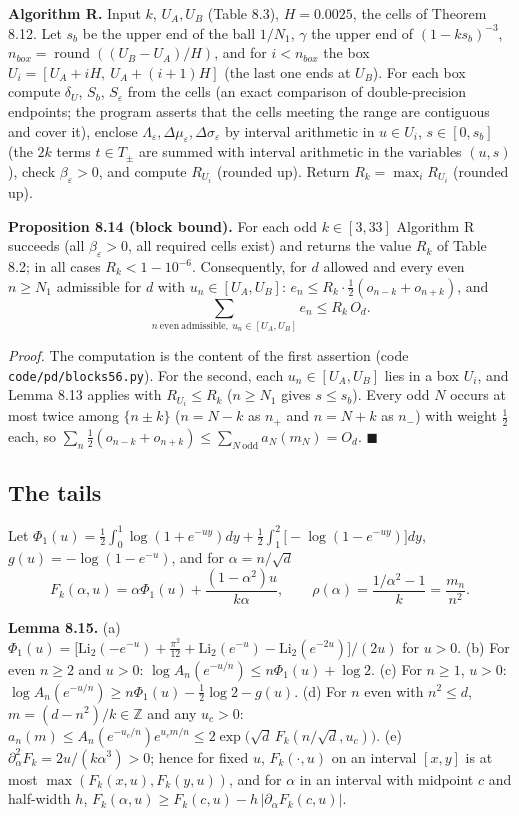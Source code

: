 \textbf{Algorithm R.} Input \(k\), \(U_A,U_B\) (Table 8.3), \(H=0.0025\), the cells of Theorem 8.12. Let \(s_b\) be the upper end of the ball \(1/N_1\), \(\gamma\) the upper end of \((1-ks_b)^{-3}\), \(n_{box}=\operatorname{round}((U_B-U_A)/H)\), and for \(i<n_{box}\) the box \(U_i=[U_A+iH,\ U_A+(i+1)H]\) (the last one ends at \(U_B\)). For each box compute \(\delta_U\), \(S_b\), \(S_\varepsilon\) from the cells (an exact comparison of double-precision endpoints; the program asserts that the cells meeting the range are contiguous and cover it), enclose \(\Lambda_\varepsilon,\Delta\mu_\varepsilon,\Delta\sigma_\varepsilon\) by interval arithmetic in \(u\in U_i\), \(s\in[0,s_b]\) (the \(2k\) terms \(t\in T_\pm\) are summed with interval arithmetic in the variables \((u,s)\)), check \(\beta_\varepsilon>0\), and compute \(R_{U_i}\) (rounded up). Return \(R_k=\max_iR_{U_i}\) (rounded up).

\textbf{Proposition 8.14 (block bound).} For each odd \(k\in[3,33]\) Algorithm R succeeds (all \(\beta_\varepsilon>0\), all required cells exist) and returns the value \(R_k\) of Table 8.2; in all cases \(R_k<1-10^{-6}\). Consequently, for \(d\) allowed and every even \(n\ge N_1\) admissible for \(d\) with \(u_n\in[U_A,U_B]\): \(e_n\le R_k\cdot\frac12(o_{n-k}+o_{n+k})\), and
\[\sum_{n\ \mathrm{even}\ \mathrm{admissible},\ u_n\in[U_A,U_B]}e_n\le R_k\,O_d.\]

\emph{Proof.} The computation is the content of the first assertion (code \texttt{code/pd/blocks56.py}). For the second, each \(u_n\in[U_A,U_B]\) lies in a box \(U_i\), and Lemma 8.13 applies with \(R_{U_i}\le R_k\) (\(n\ge N_1\) gives \(s\le s_b\)). Every odd \(N\) occurs at most twice among \(\{n\pm k\}\) (\(n=N-k\) as \(n_+\) and \(n=N+k\) as \(n_-\)) with weight \(\frac12\) each, so \(\sum_n\frac12(o_{n-k}+o_{n+k})\le\sum_{N\ \mathrm{odd}}a_N(m_N)=O_d\). \(\blacksquare\)

\subsection{The tails}\label{the-tails}

Let \(\Phi_1(u)=\frac12\int_0^1\log(1+e^{-uy})dy+\frac12\int_1^2\bigl[-\log(1-e^{-uy})\bigr]dy\), \(g(u)=-\log(1-e^{-u})\), and for \(\alpha=n/\sqrt d\)
\[F_k(\alpha,u)=\alpha\Phi_1(u)+\frac{(1-\alpha^2)u}{k\alpha},\qquad\rho(\alpha)=\frac{1/\alpha^2-1}k=\frac{m_n}{n^2}.\]

\textbf{Lemma 8.15.} (a) \(\Phi_1(u)=\bigl[\mathrm{Li}_2(-e^{-u})+\frac{\pi^2}{12}+\mathrm{Li}_2(e^{-u})-\mathrm{Li}_2(e^{-2u})\bigr]/(2u)\) for \(u>0\).
(b) For even \(n\ge2\) and \(u>0\): \(\log A_n(e^{-u/n})\le n\Phi_1(u)+\log2\).
(c) For \(n\ge1\), \(u>0\): \(\log A_n(e^{-u/n})\ge n\Phi_1(u)-\frac12\log2-g(u)\).
(d) For \(n\) even with \(n^2\le d\), \(m=(d-n^2)/k\in\mathbb Z\) and any \(u_c>0\): \(a_n(m)\le A_n(e^{-u_c/n})e^{u_cm/n}\le2\exp\bigl(\sqrt d\,F_k(n/\sqrt d,u_c)\bigr)\).
(e) \(\partial_\alpha^2F_k=2u/(k\alpha^3)>0\); hence for fixed \(u\), \(F_k(\cdot,u)\) on an interval \([x,y]\) is at most \(\max(F_k(x,u),F_k(y,u))\), and for \(\alpha\) in an interval with midpoint \(c\) and half-width \(h\), \(F_k(\alpha,u)\ge F_k(c,u)-h\,|\partial_\alpha F_k(c,u)|\).

